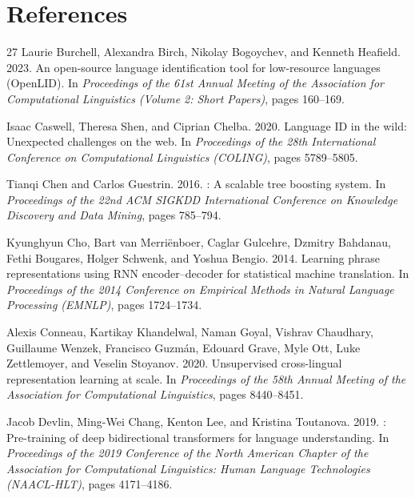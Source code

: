 \documentclass[11pt]{article}
\begin{document}
\section*{References}
\begin{thebibliography}{27}
Laurie Burchell, Alexandra Birch, Nikolay Bogoychev, and Kenneth Heafield. 2023.
\newblock An open-source language identification tool for low-resource languages ({OpenLID}).
\newblock In {\em Proceedings of the 61st Annual Meeting of the Association for Computational Linguistics (Volume 2: Short Papers)}, pages 160--169.

Isaac Caswell, Theresa Shen, and Ciprian Chelba. 2020.
\newblock Language {ID} in the wild: Unexpected challenges on the web.
\newblock In {\em Proceedings of the 28th International Conference on Computational Linguistics (COLING)}, pages 5789--5805.

Tianqi Chen and Carlos Guestrin. 2016.
: A scalable tree boosting system.
\newblock In {\em Proceedings of the 22nd ACM SIGKDD International Conference on Knowledge Discovery and Data Mining}, pages 785--794.

Kyunghyun Cho, Bart van Merri{\"e}nboer, Caglar Gulcehre, Dzmitry Bahdanau, Fethi Bougares, Holger Schwenk, and Yoshua Bengio. 2014.
\newblock Learning phrase representations using {RNN} encoder--decoder for statistical machine translation.
\newblock In {\em Proceedings of the 2014 Conference on Empirical Methods in Natural Language Processing (EMNLP)}, pages 1724--1734.

Alexis Conneau, Kartikay Khandelwal, Naman Goyal, Vishrav Chaudhary, Guillaume Wenzek, Francisco Guzm{\'a}n, Edouard Grave, Myle Ott, Luke Zettlemoyer, and Veselin Stoyanov. 2020.
\newblock Unsupervised cross-lingual representation learning at scale.
\newblock In {\em Proceedings of the 58th Annual Meeting of the Association for Computational Linguistics}, pages 8440--8451.

Jacob Devlin, Ming-Wei Chang, Kenton Lee, and Kristina Toutanova. 2019.
: Pre-training of deep bidirectional transformers for language understanding.
\newblock In {\em Proceedings of the 2019 Conference of the North American Chapter of the Association for Computational Linguistics: Human Language Technologies (NAACL-HLT)}, pages 4171--4186.


\end{thebibliography}
\end{document}
